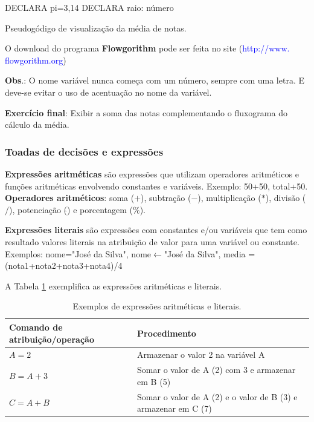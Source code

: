 \documentclass[12pt,a4paper]{article}
\begin{document}
	\begin{algorithm}[!htpb]
		\DontPrintSemicolon
		DECLARA pi=3,14 %
		DECLARA raio: número 
		\caption{Pseudogódigo de visualização da média de notas.}
		\label{algo:DeclaracaoDeConstantes}
	\end{algorithm}

	O download do programa \textbf{Flowgorithm} pode ser feita no site (\textcolor{blue}{http://www. flowgorithm.org})
	
	\textbf{Obs}.: O nome variável nunca começa com um número, sempre com uma letra. E deve-se evitar o uso de acentuação no nome da variável.
	
	\textbf{Exercício final}: Exibir a soma das notas complementando o fluxograma do cálculo da média.
	
	\subsubsection{Toadas de decisões e expressões}
	
	\textbf{Expressões aritméticas} são expressões que utilizam operadores aritméticos e funções aritméticas envolvendo constantes e variáveis. Exemplo: 50+50, total+50. \textbf{Operadores aritméticos}: soma ($+$), subtração ($-$), multiplicação ($*$), divisão ($/$), potenciação ($\hat{}$) e porcentagem ($\%$).
	
	\textbf{Expressões literais} são expressões com constantes e/ou variáveis que tem como resultado valores literais na atribuição de valor para uma variável ou constante. Exemplos: nome="José da Silva", nome$\leftarrow$"José da Silva", media = (nota1+nota2+nota3+nota4)/4
	
	A Tabela \ref{tab:Expressoes} exemplifica as expressões aritméticas e literais.
	
	\begin{table}[!htpb]
		\centering
		\begin{tabular}{|p{}|p{}|}%
			\hline
			Comando de atribuição/operação & Procedimento \\
			\hline
			$A=2$ & Armazenar o valor 2 na variável A \\
			\hline
			$B=A+3$ & Somar o valor de A (2) com 3 e armazenar em B (5) \\
			\hline
			$C=A+B$ & Somar o valor de A (2) e o valor de B (3) e armazenar em C (7) \\
			\hline
		\end{tabular}
	\caption{Exemplos de expressões aritméticas e literais.}
	\label{tab:Expressoes}
	\end{table}
	
\end{document}

